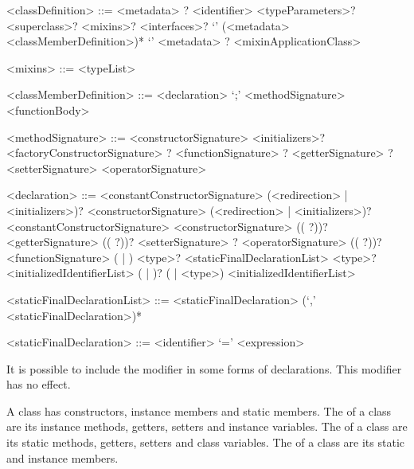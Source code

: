 \documentclass[makeidx]{article}
\begin{document}
\begin{grammar}
<classDefinition> ::= <metadata> \ABSTRACT{}? \CLASS{} <identifier> <typeParameters>?
  \gnewline{} <superclass>? <mixins>? <interfaces>?
  \gnewline{} `{' (<metadata> <classMemberDefinition>)* `}'
  \alt <metadata> \ABSTRACT{}? \CLASS{} <mixinApplicationClass>

<mixins> ::= \WITH{} <typeList>

<classMemberDefinition> ::= <declaration> `;'
  \alt <methodSignature> <functionBody>

<methodSignature> ::= <constructorSignature> <initializers>?
  \alt <factoryConstructorSignature>
  \alt \STATIC{}? <functionSignature>
  \alt \STATIC{}? <getterSignature>
  \alt \STATIC{}? <setterSignature>
  \alt <operatorSignature>

<declaration> ::= <constantConstructorSignature> (<redirection> | <initializers>)?
  \alt <constructorSignature> (<redirection> | <initializers>)?
  \alt \EXTERNAL{} <constantConstructorSignature>
  \alt \EXTERNAL{} <constructorSignature>
  \alt ((\EXTERNAL{} \STATIC{}?))? <getterSignature>
  \alt ((\EXTERNAL{} \STATIC{}?))? <setterSignature>
  \alt \EXTERNAL{}? <operatorSignature>
  \alt ((\EXTERNAL{} \STATIC{}?))? <functionSignature>
  \alt \STATIC{} (\FINAL{} | \CONST{}) <type>? <staticFinalDeclarationList>
  \alt \FINAL{} <type>? <initializedIdentifierList>
  \alt (\STATIC{} | \COVARIANT{})? (\VAR{} | <type>) <initializedIdentifierList>

<staticFinalDeclarationList> ::= \gnewline{}
  <staticFinalDeclaration> (`,' <staticFinalDeclaration>)*

<staticFinalDeclaration> ::= <identifier> `=' <expression>
\end{grammar}

\LMHash{}%
It is possible to include the modifier \COVARIANT{} in some forms of declarations.
This modifier has no effect.


\LMHash{}%
A class has constructors, instance members and static members.
The  of a class
are its instance methods, getters, setters and instance variables.
The  of a class
are its static methods, getters, setters and class variables.
The  of a class
are its static and instance members.
\end{document}
